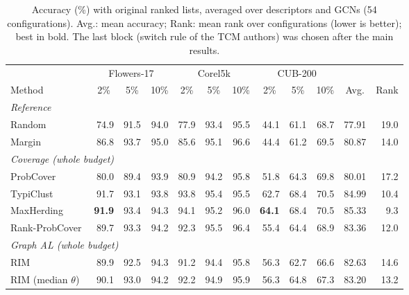 \begin{table}[t]
\centering
\caption{Accuracy (\%) with original ranked lists, averaged over descriptors and GCNs (54 configurations). Avg.: mean accuracy; Rank: mean rank over configurations (lower is better); best in bold. The last block (switch rule of the TCM authors) was chosen after the main results.}
\label{tab:sota-none}
\footnotesize
\begin{adjustbox}{max width=\textwidth}
\begin{tabular}{lrrrrrrrrrrr}
\toprule
& \multicolumn{3}{c}{Flowers-17} & \multicolumn{3}{c}{Corel5k} & \multicolumn{3}{c}{CUB-200} & & \\
\cmidrule(lr){2-4}\cmidrule(lr){5-7}\cmidrule(lr){8-10}
Method & \multicolumn{1}{c}{2\%} & \multicolumn{1}{c}{5\%} & \multicolumn{1}{c}{10\%} & \multicolumn{1}{c}{2\%} & \multicolumn{1}{c}{5\%} & \multicolumn{1}{c}{10\%} & \multicolumn{1}{c}{2\%} & \multicolumn{1}{c}{5\%} & \multicolumn{1}{c}{10\%} & \multicolumn{1}{c}{Avg.} & \multicolumn{1}{c}{Rank} \\
\midrule
\multicolumn{12}{l}{\textit{Reference}} \\
\quad Random & 74.9 & 91.5 & 94.0 & 77.9 & 93.4 & 95.5 & 44.1 & 61.1 & 68.7 & 77.91 & 19.0 \\
\quad Margin~\cite{scheffer2001active} & 86.8 & 93.7 & 95.0 & 85.6 & 95.1 & 96.6 & 44.4 & 61.2 & 69.5 & 80.87 & 14.0 \\
\multicolumn{12}{l}{\textit{Coverage (whole budget)}} \\
\quad ProbCover~\cite{yehuda2022active} & 80.0 & 89.4 & 93.9 & 80.9 & 94.2 & 95.8 & 51.8 & 64.3 & 69.8 & 80.01 & 17.2 \\
\quad TypiClust~\cite{hacohen2022active} & 91.7 & 93.1 & 93.8 & 93.8 & 95.4 & 95.5 & 62.7 & 68.4 & 70.5 & 84.99 & 10.4 \\
\quad MaxHerding~\cite{bae2024generalized} & \textbf{91.9} & 93.4 & 94.3 & 94.1 & 95.2 & 96.0 & \textbf{64.1} & 68.4 & 70.5 & 85.33 & 9.3 \\
\quad Rank-ProbCover & 89.7 & 93.3 & 94.2 & 92.3 & 95.5 & 96.4 & 55.4 & 64.4 & 68.9 & 83.36 & 12.0 \\
\multicolumn{12}{l}{\textit{Graph AL (whole budget)}} \\
\quad RIM~\cite{zhang2021rim} & 89.9 & 92.5 & 94.3 & 91.2 & 94.4 & 95.8 & 56.3 & 62.7 & 66.6 & 82.63 & 14.6 \\
\quad RIM (median $\theta$)~\cite{zhang2021rim} & 90.1 & 93.0 & 94.2 & 92.2 & 94.9 & 95.9 & 56.3 & 64.8 & 67.3 & 83.20 & 13.2 \\

\end{tabular}
\end{adjustbox}
\end{table}
